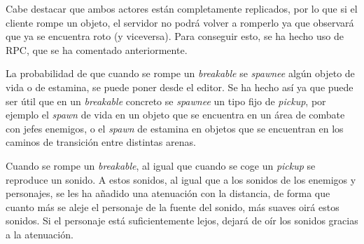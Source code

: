 Cabe destacar que ambos actores están completamente replicados, por lo que si el cliente rompe un objeto, el servidor no podrá volver a romperlo ya que observará que ya se encuentra roto (y viceversa). Para conseguir esto, se ha hecho uso de \ac{RPC}, que se ha comentado anteriormente.

La probabilidad de que cuando se rompe un \textit{breakable} se \textit{spawnee} algún objeto de vida o de estamina, se puede poner desde el editor. Se ha hecho así ya que puede ser útil que en un \textit{breakable} concreto se \textit{spawnee} un tipo fijo de \textit{pickup}, por ejemplo el \textit{spawn} de vida en un objeto que se encuentra en un área de combate con jefes enemigos, o el \textit{spawn} de estamina en objetos que se encuentran en los caminos de transición entre distintas arenas. 

Cuando se rompe un \textit{breakable}, al igual que cuando se coge un \textit{pickup} se reproduce un sonido. A estos sonidos, al igual que a los sonidos de los enemigos y personajes, se les ha añadido una atenuación con la distancia, de forma que cuanto más se aleje el personaje de la fuente del sonido, más suaves oirá estos sonidos. Si el personaje está suficientemente lejos, dejará de oír los sonidos gracias a la atenuación. 
